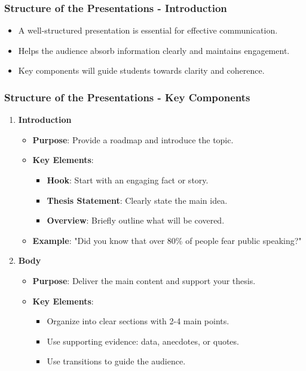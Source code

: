 \documentclass[aspectratio=169]{beamer}
\begin{document}
\begin{frame}[fragile]
    \frametitle{Structure of the Presentations - Introduction}
    \begin{itemize}
        \item A well-structured presentation is essential for effective communication.
        \item Helps the audience absorb information clearly and maintains engagement.
        \item Key components will guide students towards clarity and coherence.
    \end{itemize}
\end{frame}

\begin{frame}[fragile]
    \frametitle{Structure of the Presentations - Key Components}
    \begin{enumerate}
        \item \textbf{Introduction}
        \begin{itemize}
            \item \textbf{Purpose}: Provide a roadmap and introduce the topic.
            \item \textbf{Key Elements}:
            \begin{itemize}
                \item \textbf{Hook}: Start with an engaging fact or story.
                \item \textbf{Thesis Statement}: Clearly state the main idea.
                \item \textbf{Overview}: Briefly outline what will be covered.
            \end{itemize}
            \item \textbf{Example}: "Did you know that over 80\% of people fear public speaking?"
        \end{itemize}
        
        \item \textbf{Body}
        \begin{itemize}
            \item \textbf{Purpose}: Deliver the main content and support your thesis.
            \item \textbf{Key Elements}:
            \begin{itemize}
                \item Organize into clear sections with 2-4 main points.
                \item Use supporting evidence: data, anecdotes, or quotes.
                \item Use transitions to guide the audience.
            \end{itemize}
        \end{itemize}
    \end{enumerate}
\end{frame}
\end{document}
